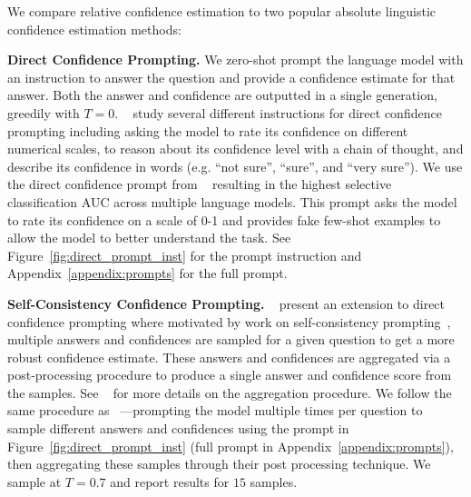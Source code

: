 We compare relative confidence estimation to two popular absolute linguistic confidence estimation methods: 

\textbf{Direct Confidence Prompting.} We zero-shot prompt the language model with an instruction to answer the question and provide a confidence estimate for that answer. Both the answer and confidence are outputted in a single generation, greedily with $T=0$. ~\cite{surrogate-models} study several different instructions for direct confidence prompting including asking the model to rate its confidence on different numerical scales, to reason about its confidence level with a chain of thought, and describe its confidence in words (e.g. ``not sure'', ``sure'', and ``very sure''). We use the direct confidence prompt from ~\cite{surrogate-models} resulting in the highest selective classification AUC across multiple language models. This prompt asks the model to rate its confidence on a scale of 0-1 and provides fake few-shot examples to allow the model to better understand the task. See Figure~\ref{fig:direct_prompt_inst} for the prompt instruction and Appendix~\ref{appendix:prompts} for the full prompt.

\textbf{Self-Consistency Confidence Prompting.} ~\cite{xiong2023can} present an extension to direct confidence prompting where motivated by work on self-consistency prompting~\citep{Wang2022SelfConsistencyIC}, multiple answers and confidences are sampled for a given question to get a more robust confidence estimate. These answers and confidences are aggregated via a post-processing procedure to produce a single answer and confidence score from the samples. See ~\cite{xiong2023can} for more details on the aggregation procedure. We follow the same procedure as ~\cite{xiong2023can}---prompting the model multiple times per question to sample different answers and confidences using the prompt in Figure~\ref{fig:direct_prompt_inst} (full prompt in Appendix~\ref{appendix:prompts}), then aggregating these samples through their post processing technique. We sample at $T=0.7$ and report results for $15$ samples.


